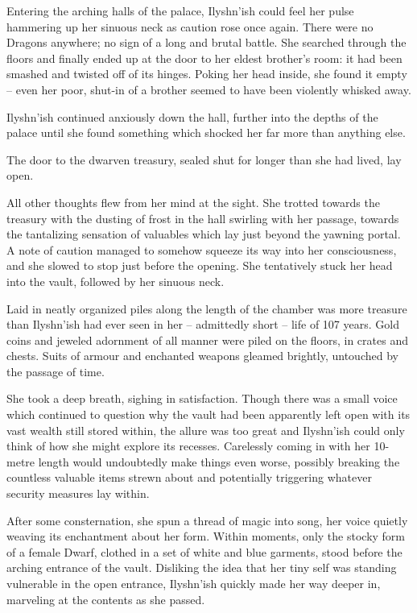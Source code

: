  

Entering the arching halls of the palace, Ilyshn’ish could feel her pulse hammering up her sinuous neck as caution rose once again. There were no Dragons anywhere; no sign of a long and brutal battle. She searched through the floors and finally ended up at the door to her eldest brother’s room: it had been smashed and twisted off of its hinges. Poking her head inside, she found it empty – even her poor, shut-in of a brother seemed to have been violently whisked away.

 

Ilyshn’ish continued anxiously down the hall, further into the depths of the palace until she found something which shocked her far more than anything else.

 

The door to the dwarven treasury, sealed shut for longer than she had lived, lay open.

 

All other thoughts flew from her mind at the sight. She trotted towards the treasury with the dusting of frost in the hall swirling with her passage, towards the tantalizing sensation of valuables which lay just beyond the yawning portal. A note of caution managed to somehow squeeze its way into her consciousness, and she slowed to stop just before the opening. She tentatively stuck her head into the vault, followed by her sinuous neck.

 

Laid in neatly organized piles along the length of the chamber was more treasure than Ilyshn’ish had ever seen in her – admittedly short – life of 107 years. Gold coins and jeweled adornment of all manner were piled on the floors, in crates and chests. Suits of armour and enchanted weapons gleamed brightly, untouched by the passage of time.

 

She took a deep breath, sighing in satisfaction. Though there was a small voice which continued to question why the vault had been apparently left open with its vast wealth still stored within, the allure was too great and Ilyshn’ish could only think of how she might explore its recesses. Carelessly coming in with her 10-metre length would undoubtedly make things even worse, possibly breaking the countless valuable items strewn about and potentially triggering whatever security measures lay within.

 

After some consternation, she spun a thread of magic into song, her voice quietly weaving its enchantment about her form. Within moments, only the stocky form of a female Dwarf, clothed in a set of white and blue garments, stood before the arching entrance of the vault. Disliking the idea that her tiny self was standing vulnerable in the open entrance, Ilyshn’ish quickly made her way deeper in, marveling at the contents as she passed.

